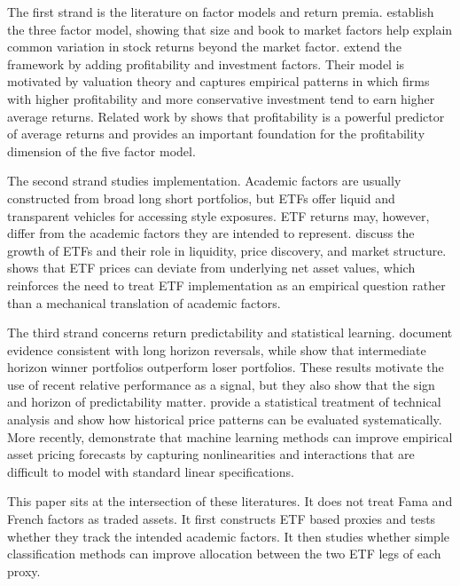 \documentclass[investment,article,submit,pdftex,moreauthors]{Definitions/mdpi}
\begin{document}
The first strand is the literature on factor models and return premia. \citet{fama1993common} establish the three factor model, showing that size and book to market factors help explain common variation in stock returns beyond the market factor. \citet{fama2015five} extend the framework by adding profitability and investment factors. Their model is motivated by valuation theory and captures empirical patterns in which firms with higher profitability and more conservative investment tend to earn higher average returns. Related work by \citet{novymarx2013other} shows that profitability is a powerful predictor of average returns and provides an important foundation for the profitability dimension of the five factor model.

The second strand studies implementation. Academic factors are usually constructed from broad long short portfolios, but ETFs offer liquid and transparent vehicles for accessing style exposures. ETF returns may, however, differ from the academic factors they are intended to represent. \citet{bendavid2017exchange} discuss the growth of ETFs and their role in liquidity, price discovery, and market structure. \citet{petajisto2017inefficiencies} shows that ETF prices can deviate from underlying net asset values, which reinforces the need to treat ETF implementation as an empirical question rather than a mechanical translation of academic factors.

The third strand concerns return predictability and statistical learning. \citet{debondt1985overreact} document evidence consistent with long horizon reversals, while \citet{jegadeesh1993returns} show that intermediate horizon winner portfolios outperform loser portfolios. These results motivate the use of recent relative performance as a signal, but they also show that the sign and horizon of predictability matter. \citet{lo2000foundations} provide a statistical treatment of technical analysis and show how historical price patterns can be evaluated systematically. More recently, \citet{gu2020empirical} demonstrate that machine learning methods can improve empirical asset pricing forecasts by capturing nonlinearities and interactions that are difficult to model with standard linear specifications.

This paper sits at the intersection of these literatures. It does not treat Fama and French factors as traded assets. It first constructs ETF based proxies and tests whether they track the intended academic factors. It then studies whether simple classification methods can improve allocation between the two ETF legs of each proxy.
\end{document}
